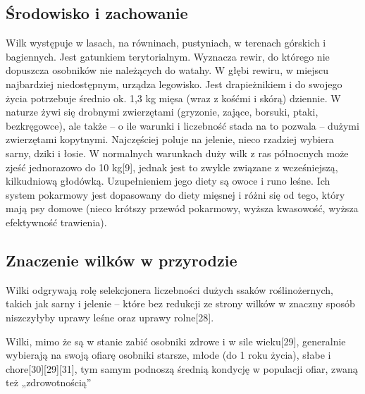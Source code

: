 \documentclass[12pt, letterpaper, titlepage]{article}
\begin{document}
\subsection{Środowisko i zachowanie}
Wilk występuje w lasach, na równinach, pustyniach, w terenach górskich i bagiennych. Jest gatunkiem terytorialnym. Wyznacza rewir, do którego nie dopuszcza osobników nie należących do watahy. W głębi rewiru, w miejscu najbardziej niedostępnym, urządza legowisko. Jest drapieżnikiem i do swojego życia potrzebuje średnio ok. 1,3 kg mięsa (wraz z kośćmi i skórą) dziennie. W naturze żywi się drobnymi zwierzętami (gryzonie, zające, borsuki, ptaki, bezkręgowce), ale także – o ile warunki i liczebność stada na to pozwala – dużymi zwierzętami kopytnymi. Najczęściej poluje na jelenie, nieco rzadziej wybiera sarny, dziki i łosie. W normalnych warunkach duży wilk z ras północnych może zjeść jednorazowo do 10 kg[9], jednak jest to zwykle związane z wcześniejszą, kilkudniową głodówką. Uzupełnieniem jego diety są owoce i runo leśne. Ich system pokarmowy jest dopasowany do diety mięsnej i różni się od tego, który mają psy domowe (nieco krótszy przewód pokarmowy, wyższa kwasowość, wyższa efektywność trawienia).
\subsection{Znaczenie wilków w przyrodzie}
Wilki odgrywają rolę selekcjonera liczebności dużych ssaków roślinożernych, takich jak sarny i jelenie – które bez redukcji ze strony wilków w znaczny sposób niszczyłyby uprawy leśne oraz uprawy rolne[28].

Wilki, mimo że są w stanie zabić osobniki zdrowe i w sile wieku[29], generalnie wybierają na swoją ofiarę osobniki starsze, młode (do 1 roku życia), słabe i chore[30][29][31], tym samym podnoszą średnią kondycję w populacji ofiar, zwaną też „zdrowotnością”
\end{document}
